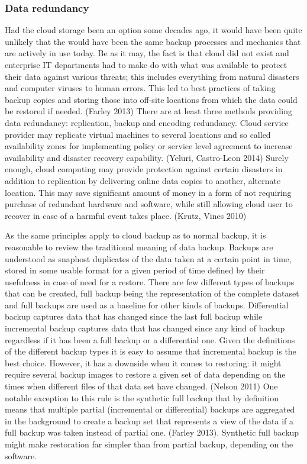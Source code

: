 \documentclass{article}
\begin{document}
\subsubsection{Data redundancy}
Had the cloud storage been an option some decades ago, it would have been quite unlikely that the would have been the same backup processes and mechanics that are actively in use today. Be as it may, the fact is that cloud did not exist and enterprise IT departments had to make do with what was available to protect their data against various threats; this includes everything from natural disasters and computer viruses to human errors. This led to best practices of taking backup copies and storing those into off-site locations from which the data could be restored if needed. (Farley 2013) 
There are at least three methods providing data redundancy: replication, backup and encoding redundancy. Cloud service provider may replicate virtual machines to several locations and so called availability zones for implementing policy or service level agreement to increase availability and disaster recovery capability. (Yeluri, Castro-Leon 2014) Surely enough, cloud computing may provide protection against certain disasters in addition to replication by delivering online data copies to another, alternate location. This may save significant amount of money in a form of not requiring purchase of redundant hardware and software, while still allowing cloud user to recover in case of a harmful event takes place. (Krutz, Vines 2010)
\par
As the same principles apply to cloud backup as to normal backup, it is reasonable to review the traditional meaning of data backup. Backups are understood as snaphost duplicates of the data taken at a certain point in time, stored in some usable format for a given period of time defined by their usefulness in case of need for a restore. There are few different types of backups that can be created, full backup being the representation of the complete dataset and full backups are used as a baseline for other kinds of backups. Differential backup captures data that has changed since the last full backup while incremental backup captures data that has changed since any kind of backup regardless if it has been a full backup or a differential one. Given the definitions of the different backup types it is easy to assume that incremental backup is the best choice. However, it has a downside when it comes to restoring: it might require several backup images to restore a given set of data depending on the times when different files of that data set have changed. (Nelson 2011) One notable exception to this rule is the synthetic full backup that by definition means that multiple partial (incremental or differential) backups are aggregated in the background to create a backup set that represents a view of the data if a full backup was taken instead of partial one. (Farley 2013). Synthetic full backup might make restoration far simpler than from partial backup, depending on the software.
\end{document}
